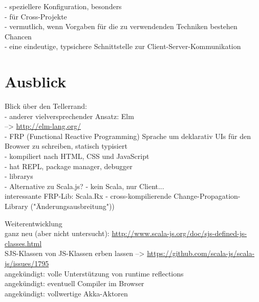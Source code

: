 \documentclass[a4paper, 12pt, hidelinks, listof=totoc, listoftables=totoc, bibliography=totoc]{scrreprt}
\begin{document}
- speziellere Konfiguration, besonders \\
  - für Cross-Projekte \\
  - vermutlich, wenn Vorgaben für die zu verwendenden Techniken bestehen \\

Chancen \\

- eine eindeutige, typsichere Schnittstelle zur Client-Server-Kommunikation \\





\section{Ausblick}

Blick über den Tellerrand: \\
- anderer vielversprechender Ansatz: Elm \\
	-->  \url{http://elm-lang.org/} \\
	- FRP (Functional Reactive Programming) Sprache um deklarativ UIs für den Browser zu schreiben, statisch typisiert \\
	- kompiliert nach \ac{HTML}, CSS und JavaScript \\
	- hat \ac{REPL}, package manager, debugger \\
	- librarys \\
	- Alternative zu Scala.js? - kein Scala, nur Client... \\

interessante FRP-Lib: Scala.Rx
- cross-kompilierende Change-Propagation-Library ("Änderungsausbreitung"))



Weiterentwicklung \\

	ganz neu (aber nicht untersucht): \url{http://www.scala-js.org/doc/sjs-defined-js-classes.html} \\
	SJS-Klassen von JS-Klassen erben lassen  -->  \url{https://github.com/scala-js/scala-js/issues/1795} \\
	
	
	angekündigt: volle Unterstützung von runtime reflections\cite[S. 2]{doeraene2013.TDI} \\
	angekündigt: eventuell Compiler im Browser\cite[Folie 39, Min. 39]{doeraene2014.WHB} \\
	angekündigt: vollwertige Akka-Aktoren\cite[Folie 39, Min. 39]{doeraene2014.WHB} \\
	
\end{document}
